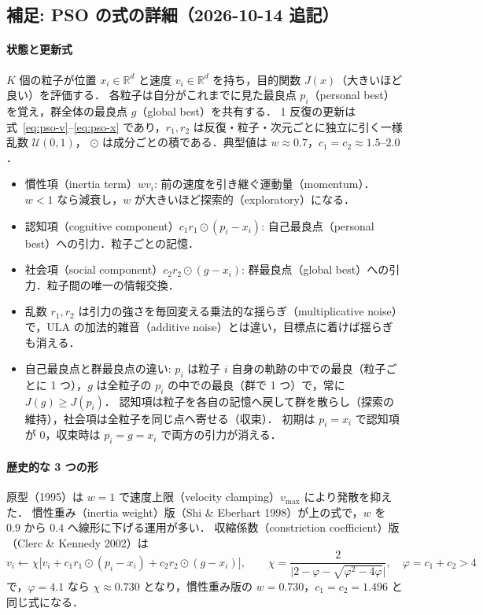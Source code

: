\documentclass[a4paper,11pt]{article}
\newcommand{\RR}{\mathbb{R}}
\begin{document}
{\color{blue}
\subsection{補足: PSO の式の詳細（2026-10-14 追記）}

\paragraph{状態と更新式}
$K$ 個の粒子が位置 $x_i \in \RR^d$ と速度 $v_i \in \RR^d$ を持ち，目的関数 $J(x)$（大きいほど良い）を評価する．
各粒子は自分がこれまでに見た最良点 $p_i$（personal best）を覚え，群全体の最良点 $g$（global best）を共有する．
1 反復の更新は式~\eqref{eq:pso-v}--\eqref{eq:pso-x} であり，$r_1, r_2$ は反復・粒子・次元ごとに独立に引く一様乱数 $\mathcal U(0,1)$，
$\odot$ は成分ごとの積である．典型値は $w \approx 0.7$，$c_1 = c_2 \approx 1.5$--$2.0$．
\begin{itemize}
  \item 慣性項（inertia term）$w v_i$: 前の速度を引き継ぐ運動量（momentum）．$w < 1$ なら減衰し，$w$ が大きいほど探索的（exploratory）になる．
  \item 認知項（cognitive component）$c_1 r_1 \odot (p_i - x_i)$: 自己最良点（personal best）への引力．粒子ごとの記憶．
  \item 社会項（social component）$c_2 r_2 \odot (g - x_i)$: 群最良点（global best）への引力．粒子間の唯一の情報交換．
  \item 乱数 $r_1, r_2$ は引力の強さを毎回変える乗法的な揺らぎ（multiplicative noise）で，ULA の加法的雑音（additive noise）とは違い，目標点に着けば揺らぎも消える．
  \item 自己最良点と群最良点の違い: $p_i$ は粒子 $i$ 自身の軌跡の中での最良（粒子ごとに 1 つ），$g$ は全粒子の $p_i$ の中での最良（群で 1 つ）で，常に $J(g) \ge J(p_i)$．
        認知項は粒子を各自の記憶へ戻して群を散らし（探索の維持），社会項は全粒子を同じ点へ寄せる（収束）．
        初期は $p_i = x_i$ で認知項が 0，収束時は $p_i = g = x_i$ で両方の引力が消える．
\end{itemize}

\paragraph{歴史的な 3 つの形}
原型（1995）は $w = 1$ で速度上限（velocity clamping）$v_{\max}$ により発散を抑えた．
慣性重み（inertia weight）版（Shi \& Eberhart 1998）が上の式で，$w$ を $0.9$ から $0.4$ へ線形に下げる運用が多い．
収縮係数（constriction coefficient）版（Clerc \& Kennedy 2002）は
\begin{equation}
  v_i \leftarrow \chi \big[ v_i + c_1 r_1 \odot (p_i - x_i) + c_2 r_2 \odot (g - x_i) \big], \qquad
  \chi = \frac{2}{\lvert 2 - \varphi - \sqrt{\varphi^2 - 4\varphi} \rvert}, \quad \varphi = c_1 + c_2 > 4
\end{equation}
で，$\varphi = 4.1$ なら $\chi \approx 0.730$ となり，慣性重み版の $w = 0.730$，$c_1 = c_2 = 1.496$ と同じ式になる．

}
\end{document}

